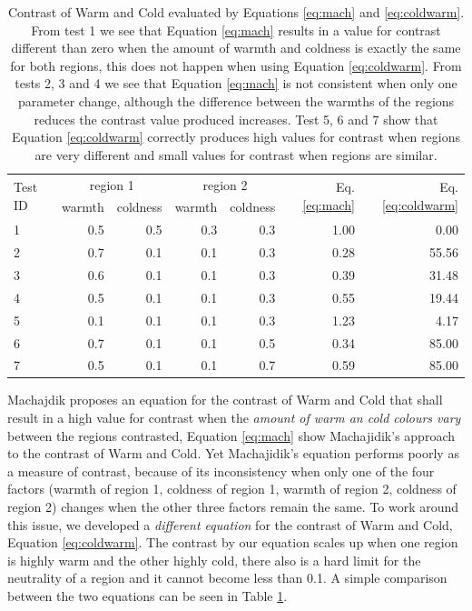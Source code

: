 \documentclass[11pt,a4paper,twoside,openright]{report}
\begin{document}
\begin{table}[pht]  %
\centering
\begin{tabular}{l|r|r|r|r|r|r}
\toprule
\multirow{2}{*}{Test ID}
  & \multicolumn{2}{c}{region 1}
  & \multicolumn{2}{c}{region 2}
  & \multirow{2}{*}{Eq. \ref{eq:mach}}
  & \multirow{2}{*}{Eq. \ref{eq:coldwarm}}
  \\
\cline{2-5}
& warmth & coldness & warmth & coldness \\
\midrule
1 & 0.5 & 0.5 & 0.3 & 0.3 & 1.00 & 0.00  \\
2 & 0.7 & 0.1 & 0.1 & 0.3 & 0.28 & 55.56 \\
3 & 0.6 & 0.1 & 0.1 & 0.3 & 0.39 & 31.48 \\
4 & 0.5 & 0.1 & 0.1 & 0.3 & 0.55 & 19.44 \\
5 & 0.1 & 0.1 & 0.1 & 0.3 & 1.23 & 4.17  \\
6 & 0.7 & 0.1 & 0.1 & 0.5 & 0.34 & 85.00 \\
7 & 0.5 & 0.1 & 0.1 & 0.7 & 0.59 & 85.00 \\
\bottomrule
\end{tabular}
\caption[Contrast of Warm and Cold]{Contrast of Warm and Cold evaluated by
Equations \ref{eq:mach} and \ref{eq:coldwarm}.  From test 1 we see that
Equation \ref{eq:mach} results in a value for contrast different than zero when
the amount of warmth and coldness is exactly the same for both regions, this
does not happen when using Equation \ref{eq:coldwarm}.  From tests 2, 3 and 4
we see that Equation \ref{eq:mach} is not consistent when only one parameter
change, although the difference between the warmths of the regions reduces the
contrast value produced increases.  Test 5, 6 and 7 show that Equation
\ref{eq:coldwarm} correctly produces high values for contrast when regions are
very different and small values for contrast when regions are similar.}
\label{tab:cweq}
\end{table}

Machajdik \cite{mach10clas} proposes an equation for the contrast of Warm and
Cold that shall result in a high value for contrast when the \emph{amount of
warm an cold colours vary} between the regions contrasted, Equation
\ref{eq:mach} show Machajidik's approach to the contrast of Warm and Cold.  Yet
Machajidik's equation performs poorly as a measure of contrast, because of its
inconsistency when only one of the four factors (warmth of region 1, coldness
of region 1, warmth of region 2, coldness of region 2) changes when the other
three factors remain the same.  To work around this issue, we developed a
\emph{different equation} for the contrast of Warm and Cold, Equation
\ref{eq:coldwarm}.  The contrast by our equation scales up when one region is
highly warm and the other highly cold, there also is a hard limit for the
neutrality of a region and it cannot become less than 0.1.  A simple comparison
between the two equations can be seen in Table \ref{tab:cweq}.
\end{document}

